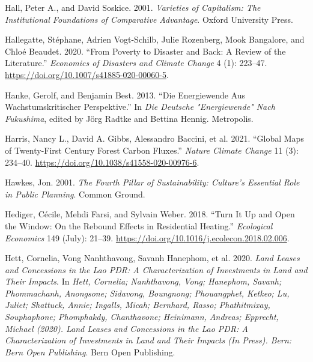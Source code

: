 \documentclass[
  a4paper,
  DIV=11,
  numbers=noendperiod,
  oneside,
  openany]{scrreprt}
\newlength{\cslhangindent}
\newenvironment{CSLReferences}[2] %
 {\begin{list}{}{%
  \setlength{\itemindent}{0pt}
  \setlength{\leftmargin}{0pt}
  \setlength{\parsep}{0pt}
  \ifodd #1
   \setlength{\leftmargin}{\cslhangindent}
   \setlength{\itemindent}{-1\cslhangindent}
  \fi
  \setlength{\itemsep}{#2\baselineskip}}}
 {\end{list}}
\begin{document}
\begin{CSLReferences}{1}{1}
Hall, Peter A., and David Soskice. 2001. \emph{Varieties of
{Capitalism}: {The Institutional Foundations} of {Comparative
Advantage}}. Oxford University Press.

Hallegatte, Stéphane, Adrien Vogt-Schilb, Julie Rozenberg, Mook
Bangalore, and Chloé Beaudet. 2020. {``From {Poverty} to {Disaster} and
{Back}: A {Review} of the {Literature}.''} \emph{Economics of Disasters
and Climate Change} 4 (1): 223--47.
\url{https://doi.org/10.1007/s41885-020-00060-5}.

Hanke, Gerolf, and Benjamin Best. 2013. {``Die {Energiewende} Aus
Wachstumskritischer {Perspektive}.''} In \emph{Die Deutsche
"{Energiewende}" Nach {Fukushima}}, edited by Jörg Radtke and Bettina
Hennig. Metropolis.

{Harris, Nancy L., David A. Gibbs, Alessandro Baccini, et al.} 2021.
{``Global Maps of Twenty-First Century Forest Carbon Fluxes.''}
\emph{Nature Climate Change} 11 (3): 234--40.
\url{https://doi.org/10.1038/s41558-020-00976-6}.

Hawkes, Jon. 2001. \emph{The {Fourth Pillar} of {Sustainability}:
{Culture}'s {Essential Role} in {Public Planning}}. Common Ground.

Hediger, Cécile, Mehdi Farsi, and Sylvain Weber. 2018. {``Turn {It Up}
and {Open} the {Window}: {On} the {Rebound Effects} in {Residential
Heating}.''} \emph{Ecological Economics} 149 (July): 21--39.
\url{https://doi.org/10.1016/j.ecolecon.2018.02.006}.

Hett, Cornelia, Vong Nanhthavong, Savanh Hanephom, et al. 2020.
\emph{Land {Leases} and {Concessions} in the {Lao PDR}: {A}
Characterization of Investments in Land and Their Impacts}. In
\emph{Hett, Cornelia; Nanhthavong, Vong; Hanephom, Savanh; Phommachanh,
Anongsone; Sidavong, Boungnong; Phouangphet, Ketkeo; Lu, Juliet;
Shattuck, Annie; Ingalls, Micah; Bernhard, Rasso; Phathitmixay,
Souphaphone; Phomphakdy, Chanthavone; Heinimann, Andreas; Epprecht,
Michael (2020). Land Leases and Concessions in the Lao PDR: A
Characterization of Investments in Land and Their Impacts (In Press).
Bern: Bern Open Publishing}. Bern Open Publishing.


\end{CSLReferences}
\end{document}
